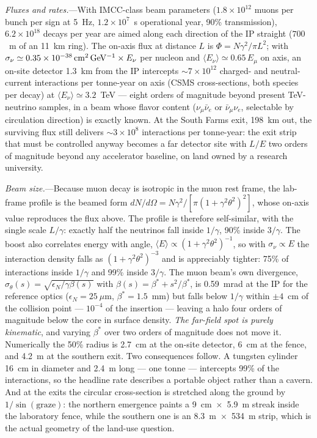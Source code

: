 \documentclass[aps,prl,reprint,superscriptaddress,nofootinbib]{revtex4-2}
\begin{document}
\emph{Fluxes and rates.}---With IMCC-class beam parameters
($1.8\times10^{12}$ muons per bunch per sign at 5~Hz, $1.2\times10^{7}$~s
operational year, 90\% transmission), $6.2\times10^{18}$ decays per year
are aimed along each direction of the IP straight ($700$~m of an 11~km
ring). The on-axis flux at distance $L$ is
$\Phi = N\gamma^{2}/\pi L^{2}$; with
$\sigma_\nu \simeq 0.35\times10^{-38}\,{\rm cm^2\,GeV^{-1}}\times E_\nu$
per nucleon and $\langle E_\nu\rangle \simeq 0.65\,E_\mu$ on axis, an
on-site detector 1.3~km from the IP intercepts
${\sim}7\times10^{12}$ charged- and neutral-current interactions per
tonne-year on axis (CSMS cross-sections, both species per decay) at
$\langle E_\nu\rangle\simeq3.2$~TeV --- eight orders of
magnitude beyond present TeV-neutrino samples, in a beam whose flavor
content ($\nu_\mu\bar\nu_e$ or $\bar\nu_\mu\nu_e$, selectable by
circulation direction) is exactly known. At the South Farms exit,
198~km out, the surviving flux still delivers
${\sim}3\times10^{8}$ interactions per tonne-year: the exit strip that must be
controlled anyway becomes a far detector site with $L/E$ two orders of
magnitude beyond any accelerator baseline, on land owned by a research
university.

\emph{Beam size.}---Because muon decay is isotropic in the muon rest frame,
the lab-frame profile is the beamed form
$dN/d\Omega = N\gamma^{2}/[\pi(1+\gamma^{2}\theta^{2})^{2}]$, whose on-axis
value reproduces the flux above. The profile is therefore self-similar, with
the single scale $L/\gamma$: exactly half the neutrinos fall inside
$1/\gamma$, 90\% inside $3/\gamma$. The boost also correlates energy with
angle, $\langle E\rangle \propto (1+\gamma^{2}\theta^{2})^{-1}$, so with
$\sigma_\nu \propto E$ the interaction density falls as
$(1+\gamma^{2}\theta^{2})^{-3}$ and is appreciably tighter: 75\% of
interactions inside $1/\gamma$ and 99\% inside $3/\gamma$. The muon beam's
own divergence, $\sigma_\theta(s) = \sqrt{\epsilon_N/\gamma\beta(s)}$ with
$\beta(s) = \beta^{*} + s^{2}/\beta^{*}$, is 0.59~mrad at the IP for the
reference optics ($\epsilon_N = 25~\mu$m, $\beta^{*} = 1.5$~mm) but falls
below $1/\gamma$ within $\pm4$~cm of the collision point --- $10^{-4}$ of the
insertion --- leaving a halo four orders of magnitude below the core in
surface density. \emph{The far-field spot is purely kinematic}, and varying
$\beta^{*}$ over two orders of magnitude does not move it. Numerically the
50\% radius is 2.7~cm at the on-site detector, 6~cm at the fence, and 4.2~m
at the southern exit. Two consequences follow. A tungsten cylinder 16~cm in
diameter and 2.4~m long --- one tonne --- intercepts 99\% of the
interactions, so the headline rate describes a portable object rather than a
cavern. And at the exits the circular cross-section is stretched along the
ground by $1/\sin(\mathrm{graze})$: the northern emergence paints a
9~cm~$\times$~5.9~m streak inside the laboratory fence, while the southern
one is an 8.3~m~$\times$~534~m strip, which is the actual geometry of the
land-use question.
\end{document}
